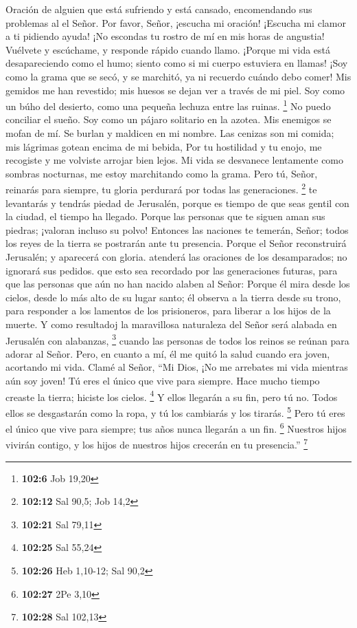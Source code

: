 Oración de alguien que está sufriendo y está cansado, encomendando sus
problemas al el Señor.  Por favor, Señor, ¡escucha mi
oración! ¡Escucha mi clamor a ti pidiendo ayuda!  ¡No
escondas tu rostro de mí en mis horas de angustia! Vuélvete y escúchame,
y responde rápido cuando llamo.  ¡Porque mi vida está
desapareciendo como el humo; siento como si mi cuerpo estuviera en
llamas!  ¡Soy como la grama que se secó, y se marchitó, ya
ni recuerdo cuándo debo comer!  Mis gemidos me han
revestido; mis huesos se dejan ver a través de mi piel.  Soy
como un búho del desierto, como una pequeña lechuza entre las ruinas.
\footnote{\textbf{102:6} Job 19,20}  No puedo conciliar el
sueño. Soy como un pájaro solitario en la azotea.  Mis
enemigos se mofan de mí. Se burlan y maldicen en mi nombre. 
Las cenizas son mi comida; mis lágrimas gotean encima de mi bebida,
 Por tu hostilidad y tu enojo, me recogiste y me volviste
arrojar bien lejos.  Mi vida se desvanece lentamente como
sombras nocturnas, me estoy marchitando como la grama. 
Pero tú, Señor, reinarás para siempre, tu gloria perdurará por todas las
generaciones. \footnote{\textbf{102:12} Sal 90,5; Job 14,2}
 te levantarás y tendrás piedad de Jerusalén, porque es
tiempo de que seas gentil con la ciudad, el tiempo ha llegado.
 Porque las personas que te siguen aman sus piedras;
¡valoran incluso su polvo!  Entonces las naciones te
temerán, Señor; todos los reyes de la tierra se postrarán ante tu
presencia.  Porque el Señor reconstruirá Jerusalén; y
aparecerá con gloria.  atenderá las oraciones de los
desamparados; no ignorará sus pedidos.  que esto sea
recordado por las generaciones futuras, para que las personas que aún no
han nacido alaben al Señor:  Porque él mira desde los
cielos, desde lo más alto de su lugar santo; él observa a la tierra
desde su trono,  para responder a los lamentos de los
prisioneros, para liberar a los hijos de la muerte.  Y como
resultadoj la maravillosa naturaleza del Señor será alabada en Jerusalén
con alabanzas, \footnote{\textbf{102:21} Sal 79,11}  cuando
las personas de todos los reinos se reúnan para adorar al Señor.
 Pero, en cuanto a mí, él me quitó la salud cuando era
joven, acortando mi vida.  Clamé al Señor, ``Mi Dios, ¡No
me arrebates mi vida mientras aún soy joven! Tú eres el único que vive
para siempre.  Hace mucho tiempo creaste la tierra; hiciste
los cielos. \footnote{\textbf{102:25} Sal 55,24}  Y ellos
llegarán a su fin, pero tú no. Todos ellos se desgastarán como la ropa,
y tú los cambiarás y los tirarás. \footnote{\textbf{102:26} Heb 1,10-12;
  Sal 90,2}  Pero tú eres el único que vive para siempre;
tus años nunca llegarán a un fin. \footnote{\textbf{102:27} 2Pe 3,10}
 Nuestros hijos vivirán contigo, y los hijos de nuestros
hijos crecerán en tu presencia.'' \footnote{\textbf{102:28} Sal 102,13}


